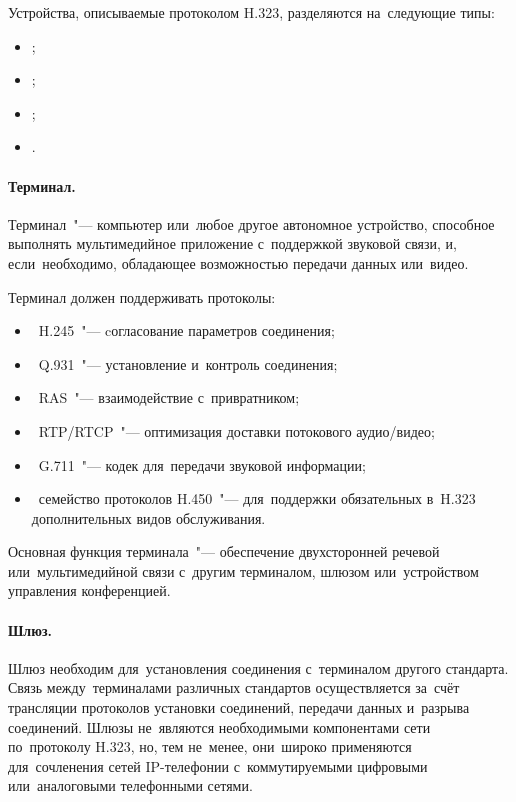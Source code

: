 Устройства, описываемые протоколом H.323, разделяются на~следующие типы:\listnopagebreak
\begin{itemize}
    \item{};
		\item{};
		\item{};
		\item{}.
\end{itemize}

\paragraph{Терминал.} Терминал~"--- компьютер или~любое другое автономное устройство, способное выполнять мультимедийное приложение с~поддержкой звуковой связи, и, если~необходимо, обладающее возможностью передачи данных или~видео.

Терминал должен поддерживать протоколы:\listnopagebreak
\begin{itemize}
    \item\ H.245~"--- cогласование параметров соединения;
    \item\ Q.931~"--- установление и~контроль соединения;
    \item\ RAS~"--- взаимодействие с~привратником;
    \item\ RTP/RTCP~"--- оптимизация доставки потокового аудио/видео;
    \item\ G.711~"--- кодек для~передачи звуковой информации;
    \item\ семейство протоколов H.450~"--- для~поддержки обязательных в~H.323 дополнительных видов обслуживания.
\end{itemize}

Основная функция терминала~"--- обеспечение двухсторонней речевой или~мультимедийной связи с~другим терминалом, шлюзом или~устройством управления конференцией.

\paragraph{Шлюз.} Шлюз необходим для~установления соединения с~терминалом другого стандарта.
Связь между~терминалами различных стандартов осуществляется за~счёт трансляции протоколов установки соединений, передачи данных и~разрыва соединений.
Шлюзы не~являются необходимыми компонентами сети по~протоколу H.323, но, тем не~менее, они~широко применяются для~сочленения сетей IP-телефонии с~коммутируемыми цифровыми или~аналоговыми телефонными сетями.

